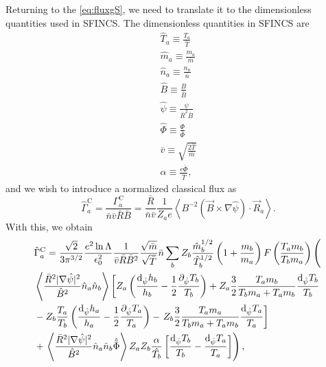 \documentclass[12pt, a4paper]{article}
\newcommand{\p}{\ensuremath{\partial}}
\renewcommand{\d}{\ensuremath{\mathrm{d}}}
\newcommand{\lang}{\left\langle}
\newcommand{\rang}{\right\rangle}
\begin{document}
Returning to the \eqref{eq:fluxgS}, we need to translate it to the dimensionless quantities used in SFINCS. The dimensionless quantities in SFINCS are
\begin{align}
  \hat{T}_a \equiv \frac{T_a}{\bar{T}} \\
  \hat{m}_a \equiv \frac{m_a}{\bar{m}} \\
  \hat{n}_a \equiv \frac{n_a}{\bar{n}} \\
  \hat{B} \equiv \frac{B}{\bar{B}} \\
  \hat{\psi} \equiv \frac{\psi}{\bar{R}^2\bar{B}} \\
  \hat{\Phi} \equiv \frac{\Phi}{\bar{\Phi}} \\
  \bar{v} \equiv \sqrt{\frac{2\bar{T}}{\bar{m}}} \\
  \alpha \equiv \frac{e\bar{\Phi}}{\bar{T}},
\end{align}
and we wish to introduce a normalized classical flux as
\begin{equation}
\hat{\Gamma}_a^{\text{C}} = \frac{\Gamma_a^{\text{C}} }{\bar{n} \bar{v}\bar{R}\bar{B}} = \frac{\bar{R}}{\bar{n}\bar{v}} \frac{1}{Z_a e} \lang B^{-2} \left(\vec{B} \times \nabla \hat{\psi}\right) \cdot \vec{R}_a \rang.
\end{equation}
With this, we obtain
\begin{equation}
  \begin{aligned}
    &\hat{\Gamma}_a^{\text{C}} 
    =  \frac{\sqrt{2}}{3\pi^{3/2}}\frac{ e^2 \ln \Lambda}{\epsilon_0^2 } \frac{1}{\bar{v} \bar{R} \bar{B}^2} \frac{\sqrt{\bar{m}}}{\sqrt{\bar{T}}} \bar{n}
    \sum_b Z_b \frac{\hat{m}_b^{1/2}}{\hat{T}_b^{1/2}} \left(1 + \frac{m_b}{m_a} \right) F\left(\frac{T_a m_b}{T_b m_a}\right) \left( \vphantom{ \lang \frac{\bar{R}^2|\nabla \hat{\psi}|^2}{\hat{B}^2} \hat{n}_a \hat{n}_b \rang}\right.\\
      &  \lang \frac{\bar{R}^2|\nabla \hat{\psi}|^2}{\hat{B}^2} \hat{n}_a \hat{n}_b \rang \left[Z_a     \left(\frac{\d_{\hat{\psi}} h_b}{h_b}  - \frac{1}{2} \frac{\p_{\hat{\psi}} T_b}{T_b}\right) 
      + Z_a  \frac{3}{2} \frac{T_a m_b}{T_b m_a + T_a m_b} \frac{\d_{\hat{\psi}} T_b}{T_b}\right. \\
      & - Z_b  \frac{T_a}{T_b}\left(\frac{\d_{\hat{\psi}} h_a}{h_a}  - \frac{1}{2} \frac{\p_{\hat{\psi}} T_a}{T_a}\right) 
      - \left.Z_b \frac{3}{2} \frac{T_a m_a}{T_b m_a + T_a m_b}  \frac{\d_{\hat{\psi}} T_a}{T_a} \right] \\
      & +\left. \lang \frac{\bar{R}^2|\nabla \hat{\psi}|^2}{\hat{B}^2} \hat{n}_a \hat{n}_b \hat{\tilde{\Phi}}\rang Z_a Z_b \frac{\alpha}{\hat{T_b}} \left[ \frac{\d_{\hat{\psi}} T_b}{T_b} - \frac{\d_{\hat{\psi}} T_a}{T_a} \right]\right),
\end{aligned} 
\end{equation}
\end{document}
